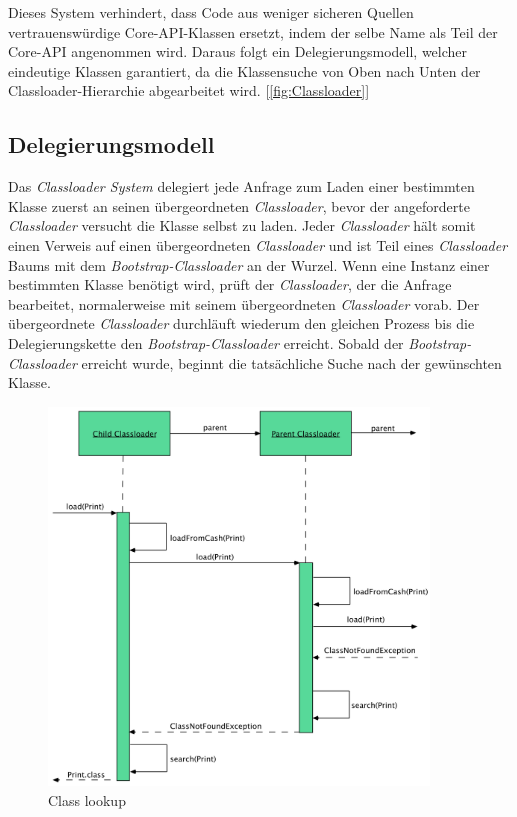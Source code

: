\bigbreak
Dieses System verhindert, dass Code aus weniger sicheren Quellen vertrauenswürdige Core-API-Klassen ersetzt, indem der selbe Name als Teil der Core-API angenommen wird. Daraus folgt ein Delegierungsmodell, welcher eindeutige Klassen garantiert, da die Klassensuche von Oben nach Unten der Classloader-Hierarchie abgearbeitet wird. [\ref{fig:Classloader}] 
  
\subsection{Delegierungsmodell}
Das \textit{Classloader System} delegiert jede Anfrage zum Laden einer bestimmten Klasse zuerst an seinen übergeordneten \textit{Classloader}, bevor der angeforderte \textit{Classloader} versucht die Klasse selbst zu laden. 
Jeder \textit{Classloader} hält somit einen Verweis auf einen übergeordneten \textit{Classloader} und ist Teil eines \textit{Classloader} Baums mit dem \textit{Bootstrap-Classloader} an der Wurzel. Wenn eine Instanz einer bestimmten Klasse benötigt wird, prüft der \textit{Classloader}, der die Anfrage bearbeitet, normalerweise mit seinem übergeordneten \textit{Classloader} vorab. Der übergeordnete \textit{Classloader} durchläuft wiederum den gleichen Prozess bis die Delegierungskette den \textit{Bootstrap-Classloader} erreicht. Sobald der \textit{Bootstrap-Classloader} erreicht wurde, beginnt die tatsächliche Suche nach der gewünschten Klasse.
\begin{figure}[h]
  \centering
  \includegraphics[width=0.9\textwidth]{material/images/deligation.png}
  \caption{Class lookup}
  \label{fig:deligation}
\end{figure}
